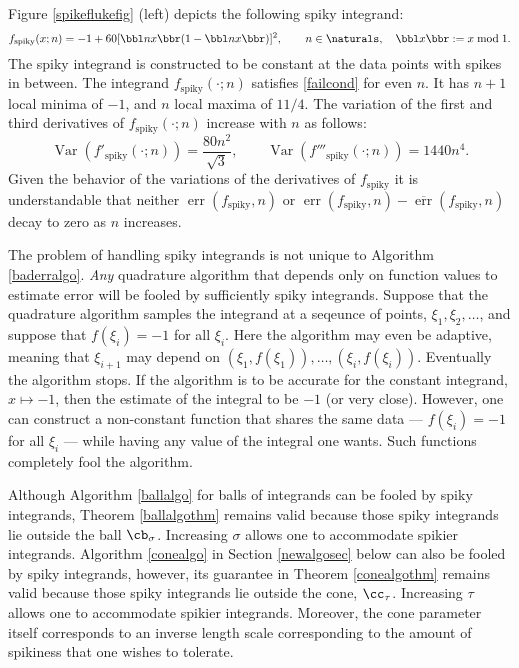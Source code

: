 \documentclass[]{article}
\DeclareMathOperator{\Var}{Var}
\DeclareMathOperator{\err}{err}
\newcommand{\oerr}{\overline{\err}}
\theoremstyle{definition}
\theoremstyle{remark}
\begin{document}
Figure \ref{spikeflukefig} (left) depicts the following spiky integrand:
\begin{equation} \label{spiky}
f_{\text{spiky}}(x;n) = -1 + 60[\bbl nx \bbr(1-\bbl nx \bbr)]^2, \qquad n \in \naturals, \quad \bbl x \bbr := x \bmod 1.
\end{equation}
The spiky integrand is constructed to be constant at the data points with spikes in between.  The integrand $f_{\text{spiky}}(\cdot;n)$ satisfies \eqref{failcond} for even $n$.  It has  $n+1$ local minima of $-1$, and $n$ local maxima of $11/4$.
The variation of the first and third derivatives of $f_{\text{spiky}}(\cdot;n)$ increase with $n$ as follows:
\begin{equation*}
\Var(f'_{\text{spiky}}(\cdot;n))= \frac{80n^2}{\sqrt{3}}, \qquad \Var(f'''_{\text{spiky}}(\cdot;n))= 1440n^4.
\end{equation*}
Given the behavior of the variations of the derivatives of $f_{\text{spiky}}$ it is understandable that neither $\err(f_{\text{spiky}},n)$ or $\err(f_{\text{spiky}},n)-\oerr(f_{\text{spiky}},n)$ decay to zero as $n$ increases.

The problem of handling spiky integrands is not unique to Algorithm \ref{baderralgo}.  \emph{Any} quadrature algorithm that depends only on function values to estimate error will be fooled by sufficiently spiky integrands.  Suppose that the quadrature algorithm samples the integrand at a seqeunce of points, $\xi_1, \xi_2, \ldots$, and suppose that $f(\xi_i)=-1$ for all $\xi_i$.  Here the algorithm may even be adaptive, meaning that $\xi_{i+1}$ may depend on $(\xi_1, f(\xi_1)), \ldots, (\xi_i, f(\xi_i))$.  Eventually the algorithm stops.  If the algorithm is to be accurate for the constant integrand, $x \mapsto -1$, then the estimate of the integral to be $-1$ (or very close).  However, one can construct a non-constant function that shares the same data --- $f(\xi_i)=-1$ for all $\xi_i$ --- while having any value of the integral one wants. Such functions completely fool the algorithm.

Although Algorithm \ref{ballalgo} for balls of integrands can be fooled by spiky integrands, Theorem \ref{ballalgothm} remains valid because those spiky integrands lie outside the ball $\cb_{\sigma}$.  Increasing $\sigma$ allows one to accommodate spikier integrands.  Algorithm \ref{conealgo} in Section \ref{newalgosec} below can also be fooled by spiky integrands, however, its guarantee in Theorem \ref{conealgothm} remains valid because those spiky integrands lie outside the cone, $\cc_{\tau}$.  Increasing $\tau$ allows one to accommodate spikier integrands.  Moreover, the cone parameter itself corresponds to an inverse length scale corresponding to the amount of spikiness that one wishes to tolerate.
\end{document}
